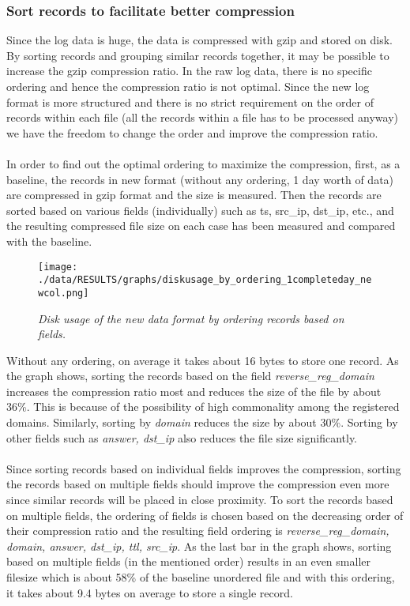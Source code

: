 \documentclass[11pt,a4paper]{article}
\begin{document}
\subsubsection{Sort records to facilitate better compression}
Since the log data is huge, the data is compressed with gzip and stored on disk. By sorting records and grouping similar records together, it may be possible to increase the gzip compression ratio. In the raw log data, there is no specific ordering and hence the compression ratio is not optimal. Since the new log format is more structured and there is no strict requirement on the order of records within each file (all the records within a file has to be processed anyway) we have the freedom to change the order and improve the compression ratio.
\\\\
In order to find out the optimal ordering to maximize the compression, first, as a baseline, the records in new format (without any ordering, 1 day worth of data) are compressed in gzip format and the size is measured. Then the records are sorted based on various fields (individually) such as ts, src\_ip, dst\_ip, etc., and the resulting compressed file size on each case has been measured and compared with the baseline.

\begin{figure}[H] 
\centering
\texttt{[image: ./data/RESULTS/graphs/diskusage\_by\_ordering\_1completeday\_newcol.png]}
\caption {\textit{Disk usage of the new data format by ordering records based on fields.}}
\end{figure}

\noindent
Without any ordering, on average it takes about 16 bytes to store one record. As the graph shows, sorting the records based on the field \textit{reverse\_reg\_domain} increases the compression ratio most and reduces the size of the file by about 36\%. This is because of the possibility of high commonality among the registered domains. Similarly, sorting by \textit{domain} reduces the size by about 30\%. Sorting by other fields such as \textit{answer, dst\_ip} also reduces the file size significantly.
\\\\
Since sorting records based on individual fields improves the compression, sorting the records based on multiple fields should improve the compression even more since similar records will be placed in close proximity. To sort the records based on multiple fields, the ordering of fields is chosen based on the decreasing order of their compression ratio and the resulting field ordering is \textit{reverse\_reg\_domain, domain, answer, dst\_ip, ttl, src\_ip}. As the last bar in the graph shows, sorting based on multiple fields (in the mentioned order) results in an even smaller filesize which is about 58\% of the baseline unordered file and with this ordering, it takes about 9.4 bytes on average to store a single record.
\end{document}
